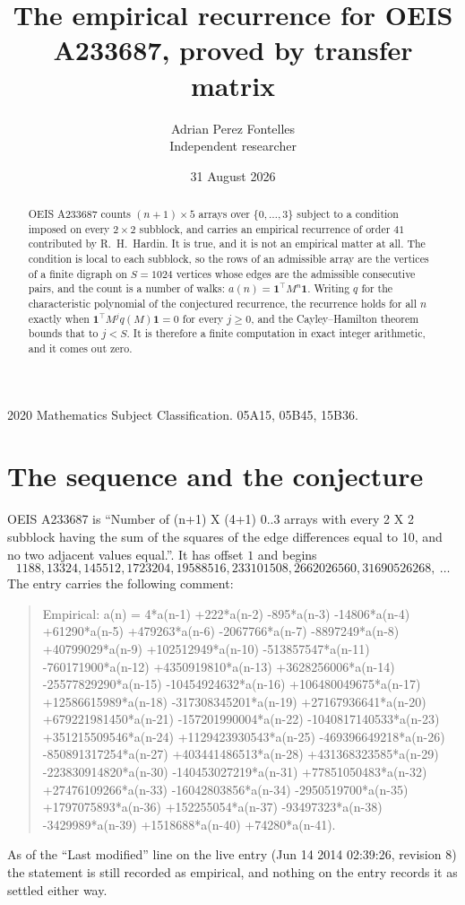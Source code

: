 \documentclass[11pt,a4paper]{article}
\title{The empirical recurrence for OEIS A233687, proved by transfer matrix}
\author{Adrian Perez Fontelles\\ \small Independent researcher}
\date{31 August 2026}
\theoremstyle{plain}
\theoremstyle{definition}
\begin{document}
\maketitle

\begin{abstract}
OEIS A233687 counts $(n+1)\times5$ arrays over $\{0,\dots,3\}$ subject to a condition imposed on
every $2\times2$ subblock, and carries an empirical recurrence of order $41$ contributed
by R.~H.~Hardin. It is true, and it is not an empirical matter at all. The condition is local
to each subblock, so the rows of an admissible array are the vertices of a finite digraph
on $S=1024$ vertices whose edges are the admissible consecutive pairs, and the count is a
number of walks: $a(n)=\mathbf{1}^{\!\top}M^{n}\mathbf{1}$. Writing $q$
for the characteristic polynomial of the conjectured recurrence, the recurrence holds for all
$n$ exactly when $\mathbf{1}^{\!\top}M^{j}q(M)\mathbf{1}=0$ for every $j\ge0$, and the
Cayley--Hamilton theorem bounds that to $j<S$. It is therefore a finite computation in exact
integer arithmetic, and it comes out zero.
\end{abstract}

\noindent\small 2020 Mathematics Subject Classification. 05A15, 05B45, 15B36.\normalsize

\section{The sequence and the conjecture}

OEIS A233687 is ``Number of (n+1) X (4+1) 0..3 arrays with every 2 X 2 subblock having the sum of the squares of the edge differences equal to 10, and no two adjacent values equal.''. It has offset $1$ and begins
\[
1188, 13324, 145512, 1723204, 19588516, 233101508, 2662026560, 31690526268,\ \dots
\]
The entry carries the following comment:
\begin{quote}\small
Empirical: a(n) = 4*a(n-1) +222*a(n-2) -895*a(n-3) -14806*a(n-4) +61290*a(n-5) +479263*a(n-6) -2067766*a(n-7) -8897249*a(n-8) +40799029*a(n-9) +102512949*a(n-10) -513857547*a(n-11) -760171900*a(n-12) +4350919810*a(n-13) +3628256006*a(n-14) -25577829290*a(n-15) -10454924632*a(n-16) +106480049675*a(n-17) +12586615989*a(n-18) -317308345201*a(n-19) +27167936641*a(n-20) +679221981450*a(n-21) -157201990004*a(n-22) -1040817140533*a(n-23) +351215509546*a(n-24) +1129423930543*a(n-25) -469396649218*a(n-26) -850891317254*a(n-27) +403441486513*a(n-28) +431368323585*a(n-29) -223830914820*a(n-30) -140453027219*a(n-31) +77851050483*a(n-32) +27476109266*a(n-33) -16042803856*a(n-34) -2950519700*a(n-35) +1797075893*a(n-36) +152255054*a(n-37) -93497323*a(n-38) -3429989*a(n-39) +1518688*a(n-40) +74280*a(n-41).
\end{quote}
As of the ``Last modified'' line on the live entry (Jun 14 2014 02:39:26, revision 8) the statement is
still recorded as empirical, and nothing on the entry records it as settled either way.
\end{document}
